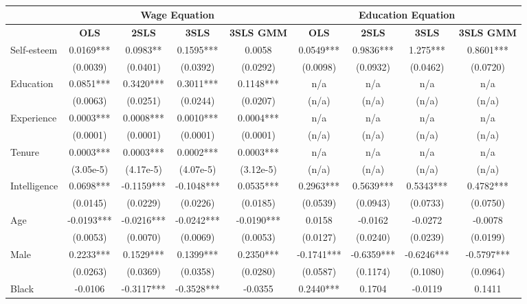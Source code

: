 \documentclass[12pt]{report}
\newcommand{\prbf}[1]{\textbf{#1}}
\begin{document}
\newpage
\begin{sidewaystable}
\small
\caption{\label{tab:wage06d}}
\vspace{2pt}
\centering\begin{tabular}{lc|c|c|c|c|c|c|c}
\hline
\hline
& \multicolumn{4}{|c|}{Wage Equation} & \multicolumn{4}{|c}{Education Equation}\\
\hline
& \prbf{OLS} & \prbf{2SLS} & \prbf{3SLS} & \prbf{3SLS GMM} & \prbf{OLS} & \prbf{2SLS} & \prbf{3SLS} & \prbf{3SLS GMM}\\
\hline
Self-esteem & 0.0169*** & 0.0983** & 0.1595*** & 0.0058 & 0.0549*** & 0.9836*** & 1.275*** & 0.8601***\\
& (0.0039) & (0.0401) & (0.0392) & (0.0292) & (0.0098) & (0.0932) & (0.0462) & (0.0720)\\
Education & 0.0851*** & 0.3420*** & 0.3011*** & 0.1148*** & n/a & n/a & n/a & n/a\\
& (0.0063) & (0.0251) & (0.0244) & (0.0207) & (n/a) & (n/a) & (n/a) & (n/a)\\
Experience & 0.0003*** & 0.0008*** & 0.0010*** & 0.0004*** & n/a & n/a & n/a & n/a\\
& (0.0001) & (0.0001) & (0.0001) & (0.0001) & (n/a) & (n/a) & (n/a) & (n/a)\\
Tenure & 0.0003*** & 0.0003*** & 0.0002*** & 0.0003*** & n/a & n/a & n/a & n/a\\
& (3.05e-5) & (4.17e-5) & (4.07e-5) & (3.12e-5) & (n/a) & (n/a) & (n/a) & (n/a)\\
Intelligence & 0.0698*** & -0.1159*** & -0.1048*** & 0.0535*** & 0.2963*** & 0.5639*** & 0.5343*** & 0.4782***\\
& (0.0145) & (0.0229) & (0.0226) & (0.0185) & (0.0539) & (0.0943) & (0.0733) & (0.0750)\\
Age & -0.0193*** & -0.0216*** & -0.0242*** & -0.0190*** & 0.0158 & -0.0162 & -0.0272 & -0.0078\\
& (0.0053) & (0.0070) & (0.0069) & (0.0053) & (0.0127) & (0.0240) & (0.0239) & (0.0199)\\
Male & 0.2233*** & 0.1529*** & 0.1399*** & 0.2350*** & -0.1741*** & -0.6359*** & -0.6246*** & -0.5797***\\
& (0.0263) & (0.0369) & (0.0358) & (0.0280) & (0.0587) & (0.1174) & (0.1080) & (0.0964)\\
Black & -0.0106 & -0.3117*** & -0.3528*** & -0.0355 & 0.2440*** & 0.1704 & -0.0119 & 0.1411\\

\end{tabular}
\end{sidewaystable}
\end{document}
